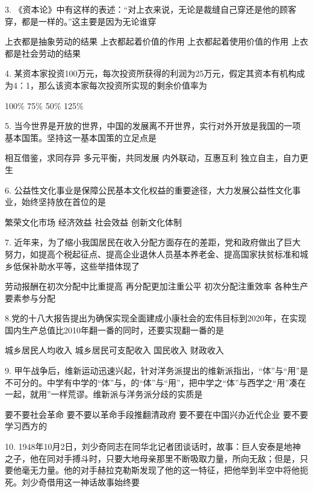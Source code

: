 3. 《资本论》中有这样的表述：“对上衣来说，无论是裁缝自己穿还是他的顾客穿，都是一样的。”这主要是因为无论谁穿
\begin{choices}
	 上衣都是抽象劳动的结果
	 上衣都起着价值的作用
	 上衣都起着使用价值的作用
	 上衣都是社会劳动的结果
\end{choices}
4. 某资本家投资100万元，每次投资所获得的利润为25万元，假定其资本有机构成为4：1，那么该资本家每次投资所实现的剩余价值率为
\begin{choices}
	 100\%
	 75\%
	 50\%
	 125\%
\end{choices}
5. 当今世界是开放的世界，中国的发展离不开世界，实行对外开放是我国的一项基本国策。坚持这一基本国策的立足点是
\begin{choices}
	 相互借鉴，求同存异
	 多元平衡，共同发展
	 内外联动，互惠互利
	 独立自主，自力更生
\end{choices}
6. 公益性文化事业是保障公民基本文化权益的重要途径，大力发展公益性文化事业，始终坚持放在首位的是
\begin{choices}
	 繁荣文化市场
	 经济效益
	 社会效益
	 创新文化体制
\end{choices}
7. 近年来，为了缩小我国居民在收入分配方面存在的差距，党和政府做出了巨大努力，如提高个税起征点、提高企业退休人员基本养老金、提高国家扶贫标准和城乡低保补助水平等，这些举措体现了
\begin{choices}
	 劳动报酬在初次分配中比重提高
	 再分配更加注重公平 
	 初次分配注重效率
	 各种生产要素参与分配
\end{choices}
8.党的十八大报告提出为确保实现全面建成小康社会的宏伟目标到2020年，在实现国内生产总值比2010年翻一番的同时，还要实现翻一番的是
\begin{choices}
	 城乡居民人均收入
	 城乡居民可支配收入
	 国民收入
	 财政收入
\end{choices}
9. 甲午战争后，维新运动迅速兴起，针对洋务派提出的维新派指出，“体”与“用”是不可分的。中学有中学的“体”与，的“体”与“用”，把中学之“体”与西学之“用”凑在一起，就用”一样荒谬。维新派与洋务派分歧的实质是
\begin{choices}
	 要不要社会革命
	 要不要以革命手段推翻清政府
	 要不要在中国兴办近代企业
	 要不要学习西方的
\end{choices}
10. 1948年10月2日，刘少奇同志在同华北记者团谈话时，故事：巨人安泰是地神之子，他在同对手搏斗时，只要大地母亲那里不断吸取力量，所向无敌；但是，只要他毫无力量。他的对手赫拉克勒斯发现了他的这一特征，把他举到半空中将他扼死。刘少奇借用这一神话故事始终要
